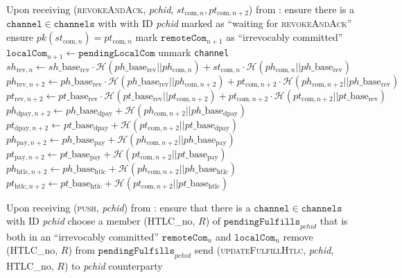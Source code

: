\begin{algorithmic}[1]
    \State Upon receiving (\textsc{revokeAndAck}, \textit{pchid},
    $st_{\mathrm{com}, n}, pt_{\mathrm{com}, n+2}$) from \bob:
    \Indent
      \State ensure there is a $\mathtt{channel} \in \mathtt{channels}$ with
      \bob{} with ID \textit{pchid} marked as ``waiting for
      \textsc{revokeAndAck}''
      \State ensure $pk\left(st_{\mathrm{com}, n}\right) = pt_{\mathrm{com}, n}$
      \State mark $\mathtt{remoteCom}_{n+1}$ as ``irrevocably committed''
      \State $\mathtt{localCom}_{n+1} \gets \mathtt{pendingLocalCom}$
      \State unmark \texttt{channel}
      \State $sh_{\mathrm{rev}, n} \gets sh\_\mathrm{base}_{\mathrm{rev}} \cdot
      \mathcal{H}\left(ph\_\mathrm{base}_{\mathrm{rev}} || ph_{\mathrm{com},
      n}\right) + st_{\mathrm{com}, n} \cdot \mathcal{H}\left(ph_{\mathrm{com},
      n} || ph\_\mathrm{base}_{\mathrm{rev}}\right)$
      \State $ph_{\mathrm{rev}, n+2} \gets ph\_\mathrm{base}_{\mathrm{rev}}
      \cdot \mathcal{H}\left(ph\_\mathrm{base}_{\mathrm{rev}} ||
      ph_{\mathrm{com}, n+2}\right) + pt_{\mathrm{com}, n+2} \cdot
      \mathcal{H}\left(ph_{\mathrm{com}, n+2} ||
      ph\_\mathrm{base}_{\mathrm{rev}}\right)$
      \State $pt_{\mathrm{rev}, n+2} \gets pt\_\mathrm{base}_{\mathrm{rev}}
      \cdot \mathcal{H}\left(pt\_\mathrm{base}_{\mathrm{rev}} ||
      pt_{\mathrm{com}, n+2}\right) + pt_{\mathrm{com}, n+2} \cdot
      \mathcal{H}\left( pt_{\mathrm{com}, n+2} ||
      pt\_\mathrm{base}_{\mathrm{rev}}\right)$
      \State $ph_{\mathrm{dpay}, n+2} \gets ph\_\mathrm{base}_{\mathrm{dpay}} +
      \mathcal{H}\left(ph_{\mathrm{com}, n+2} ||
      ph\_\mathrm{base}_{\mathrm{dpay}}\right)$
      \State $pt_{\mathrm{dpay}, n+2} \gets pt\_\mathrm{base}_{\mathrm{dpay}} +
      \mathcal{H}\left(pt_{\mathrm{com}, n+2} ||
      pt\_\mathrm{base}_{\mathrm{dpay}}\right)$
      \State $ph_{\mathrm{pay}, n+2} \gets ph\_\mathrm{base}_{\mathrm{pay}} +
      \mathcal{H}\left(ph_{\mathrm{com}, n+2} ||
      ph\_\mathrm{base}_{\mathrm{pay}}\right)$
      \State $pt_{\mathrm{pay}, n+2} \gets pt\_\mathrm{base}_{\mathrm{pay}} +
      \mathcal{H}\left(pt_{\mathrm{com}, n+2} ||
      pt\_\mathrm{base}_{\mathrm{pay}}\right)$
      \State $ph_{\mathrm{htlc}, n+2} \gets ph\_\mathrm{base}_{\mathrm{htlc}} +
      \mathcal{H}\left(ph_{\mathrm{com}, n+2} ||
      ph\_\mathrm{base}_{\mathrm{htlc}}\right)$
      \State $pt_{\mathrm{htlc}, n+2} \gets pt\_\mathrm{base}_{\mathrm{htlc}} +
      \mathcal{H}\left(pt_{\mathrm{com}, n+2} ||
      pt\_\mathrm{base}_{\mathrm{htlc}}\right)$
    \EndIndent
    \State

    \State Upon receiving (\textsc{push}, \textit{pchid}) from \environment:
    \Indent
      \State ensure that there is a $\mathtt{channel} \in \mathtt{channels}$
      with ID \textit{pchid}
      \State choose a member (HTLC\_no, $R$) of
      $\mathtt{pendingFulfills}_{\mathit{pchid}}$ that is both in an
      ``irrevocably committed'' $\mathtt{remoteCom}_n$ and $\mathtt{localCom}_n$
      \State remove (HTLC\_no, $R$) from
      $\mathtt{pendingFulfills}_{\mathit{pchid}}$
      \State send (\textsc{updateFulfillHtlc}, \textit{pchid}, HTLC\_no, $R$) to
      \textit{pchid} counterparty
    \EndIndent


\end{algorithmic}
